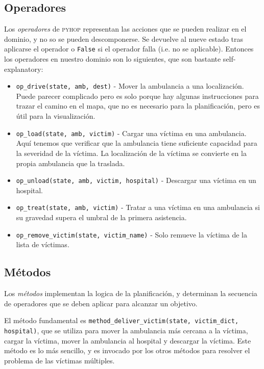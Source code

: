 \subsection{Operadores}

Los \textit{operadores} de \textsc{pyhop} representan las acciones que se pueden realizar en el dominio, y no so se pueden descomponerse. Se devuelve al nueve estado tras aplicarse el operador o \lstinline|False| si el operador falla (i.e. no se aplicable).
Entonces los operadores en nuestro dominio son lo siguientes, que son bastante self-explanatory:
\begin{itemize}
   \item \lstinline|op_drive(state, amb, dest)| - Mover la ambulancia a una localización. Puede parecer complicado pero es solo porque hay algunas instrucciones para trazar el camino en el mapa, que no es necesario para la planificación, pero es útil para la visualización. 
   \item \lstinline|op_load(state, amb, victim)| - Cargar una víctima en una ambulancia. Aquí tenemos que verificar que la ambulancia tiene suficiente capacidad para la severidad de la víctima.
   La localización de la víctima se convierte en la propia ambulancia que la traslada.
   \item \lstinline|op_unload(state, amb, victim, hospital)| - Descargar una víctima en un hospital.
   \item \lstinline|op_treat(state, amb, victim)| - Tratar a una víctima en una ambulancia si su gravedad supera el umbral de la primera asistencia.
   \item \lstinline|op_remove_victim(state, victim_name)| - Solo remueve la víctima de la lista de víctimas.
\end{itemize}

\subsection{Métodos}

Los \textit{métodos} implementan la logica de la planificación, y determinan la secuencia de operadores que se deben aplicar para alcanzar un objetivo.

El método fundamental es \lstinline|method_deliver_victim(state, victim_dict, hospital)|, que se utiliza para mover la ambulancia más cercana a la víctima, cargar la víctima, mover la ambulancia al hospital y descargar la víctima.
Este método es lo más sencillo, y es invocado por los otros métodos para resolver el problema de las víctimas múltiples.


